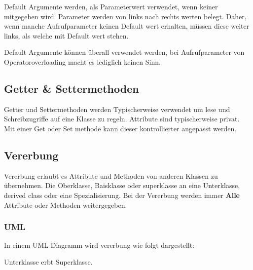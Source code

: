 Default Argumente werden, als Parameterwert verwendet, wenn keiner mitgegeben wird.
Parameter werden von links nach rechts werten belegt. 
Daher, wenn manche Aufrufparameter keinen Default wert erhalten, müssen diese weiter links, als welche mit Default wert stehen.  



Default Argumente können überall verwendet werden, bei Aufrufparameter von Operatoroverloading macht es lediglich keinen Sinn.

\subsection{Getter \& Settermethoden}

Getter und Settermethoden werden Typischerweise verwendet um lese und Schreibzugriffe auf eine Klasse zu regeln. 
Attribute sind typischerweise privat. 
Mit einer Get oder Set methode kann dieser kontrollierter angepasst  werden.\\



\subsection{Vererbung}

Vererbung erlaubt es Attribute und Methoden von anderen Klassen zu übernehmen. 
Die Oberklasse, Baisklasse oder superklasse  an eine Unterklasse, derived class oder eine Spezialisierung. 
Bei der Vererbung werden immer \textbf{Alle} Attribute oder Methoden weitergegeben.  


\subsubsection{UML}

In einem UML Diagramm wird vererbung wie folgt dargestellt:\\

\begin{center}
\end{center}

Unterklasse erbt Superklasse.\\

